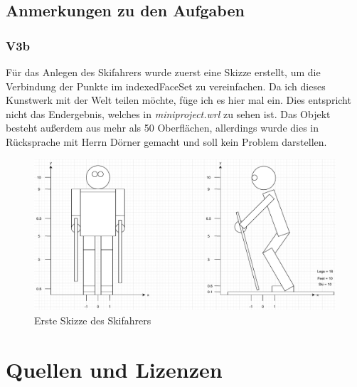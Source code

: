 \documentclass{article}
\begin{document}
\newpage

\subsection*{Anmerkungen zu den Aufgaben}
\subsubsection*{V3b}
Für das Anlegen des Skifahrers wurde zuerst eine Skizze erstellt, um die
Verbindung der Punkte im indexedFaceSet zu vereinfachen. Da ich dieses Kunstwerk
mit der Welt teilen möchte, füge ich es hier mal ein. Dies entspricht nicht das
Endergebnis, welches in \textit{miniproject.wrl} zu sehen ist. Das Objekt besteht
außerdem aus mehr als 50 Oberflächen, allerdings wurde dies in Rücksprache mit
Herrn Dörner gemacht und soll kein Problem darstellen.

\begin{figure}[h]
    \centering
    \includegraphics[scale=0.5]{skifahrer_sketch.pdf}
    \caption{Erste Skizze des Skifahrers}
\end{figure}




\newpage 

\section*{Quellen und Lizenzen}
\end{document}
